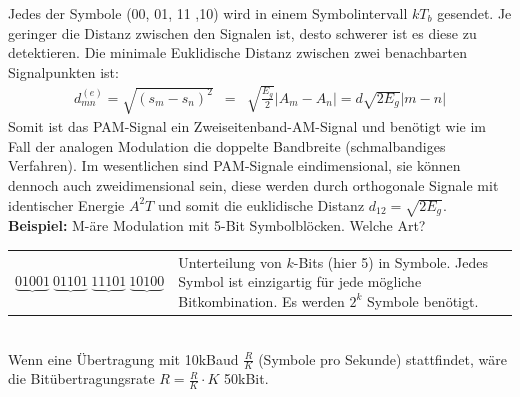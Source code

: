 Jedes der Symbole (00, 01, 11 ,10) wird in einem Symbolintervall $kT_b$ gesendet. Je geringer die Distanz zwischen den Signalen ist, desto schwerer ist es diese zu detektieren. Die minimale Euklidische Distanz zwischen zwei benachbarten Signalpunkten ist:
 \begin{eqnarray*}
 d^{(e)}_{mn} = \sqrt{(s_m - s_n)^2} &=& \sqrt{\frac{E_g}{2}} \vert A_m - A_n \vert = d \sqrt{2 E_g} \vert m-n \vert
 \end{eqnarray*}
Somit ist das PAM-Signal ein Zweiseitenband-AM-Signal und benötigt wie im Fall der analogen Modulation die doppelte Bandbreite (schmalbandiges Verfahren). Im wesentlichen sind PAM-Signale eindimensional, sie können dennoch auch zweidimensional sein, diese werden durch orthogonale Signale mit identischer Energie $A^2T$ und somit die euklidische Distanz $d_12 = \sqrt{2E_g}$.\\\vspace{6pt}
\textbf{Beispiel:} \quad M-äre Modulation mit 5-Bit Symbolblöcken. Welche Art?\\\vspace{6pt}
 \begin{tabular}{ll}
 \parbox{4cm}{
$\underbrace{01001}~ \underbrace{01101}~\underbrace{11101}~\underbrace{10100}$ }&
 \parbox{7cm}{
 Unterteilung von $k$-Bits (hier 5) in Symbole. Jedes Symbol ist einzigartig für jede mögliche Bitkombination. Es werden $2^k$ Symbole benötigt.
 }
 \end{tabular}\\\vspace{6pt}
Wenn eine Übertragung mit 10kBaud $\frac{R}{K}$ (Symbole pro Sekunde) stattfindet, wäre die Bitübertragungsrate  $R = \frac{R}{K} \cdot K$ 50kBit.\\~\vspace{2pt}\\~
